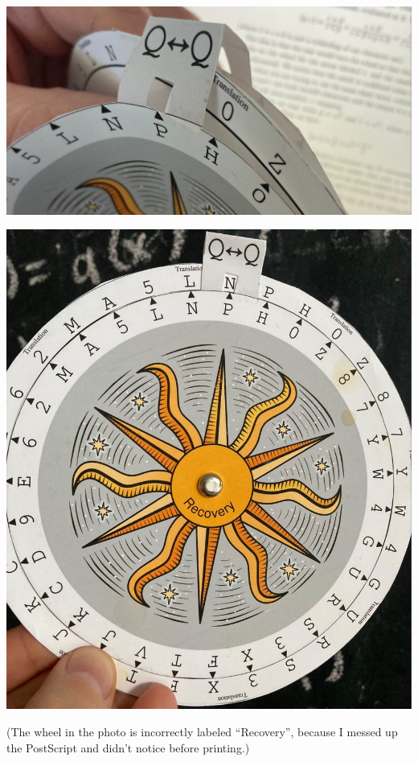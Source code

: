 \documentclass[letterpaper]{article}
\begin{document}
\begin{center}\includegraphics[scale=1.00]{images/fusion-fold.jpg}\end{center}
\begin{center}\includegraphics[scale=0.80]{images/translation-wheel.jpg}\end{center}

(The wheel in the photo is incorrectly labeled ``Recovery'', because I messed
up the PostScript and didn't notice before printing.)
\end{document}
